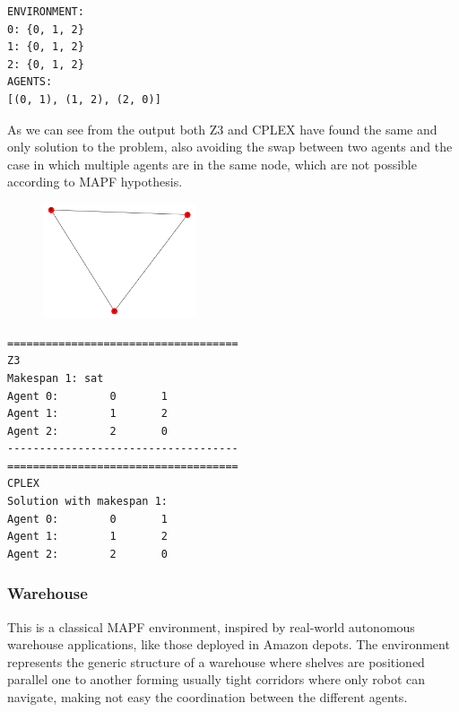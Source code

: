 \documentclass[12pt, a4paper, hidelinks]{article}
\numberwithin{equation}{section}
\begin{document}
\begin{lstlisting}[label={lst:synchronized}]
ENVIRONMENT:
0: {0, 1, 2}
1: {0, 1, 2}
2: {0, 1, 2}
AGENTS:
[(0, 1), (1, 2), (2, 0)]
\end{lstlisting}
As we can see from the output both Z3 and CPLEX have found the same and only solution to the problem,
also avoiding the swap between two agents and the case in which multiple agents are in the same node,
which are not possible according to MAPF hypothesis.
\begin{figure}
    \centering
    \includegraphics[width=0.4\textwidth]{synchronous_movement_graph.png}
\end{figure}
\begin{lstlisting}[label={lst:test}]
====================================
Z3
Makespan 1: sat
Agent 0:        0       1
Agent 1:        1       2
Agent 2:        2       0
------------------------------------
====================================
CPLEX
Solution with makespan 1:
Agent 0:        0       1
Agent 1:        1       2
Agent 2:        2       0
\end{lstlisting}

\subsubsection{Warehouse}
This is a classical MAPF environment, inspired by real-world autonomous warehouse applications, like those deployed in Amazon depots.
The environment represents the generic structure of a warehouse where shelves are positioned parallel one to another forming usually tight corridors where only robot can navigate, making not easy the coordination between the different agents.
\end{document}

